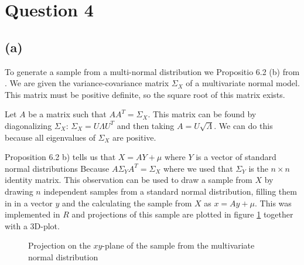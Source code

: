 \documentclass[a4paper]{article}
\begin{document}
\newpage
\section*{Question 4}
\noindent {}

\subsection*{(a)}
\noindent {}

To generate a sample from a multi-normal distribution we Propositio 6.2 (b) from \cite{course-notes}. We are given the variance-covariance matrix $\Sigma_X$ of a multivariate normal model. This matrix must be positive definite, so the square root of this matrix exists. 

Let $A$ be a matrix such that $AA^T=\Sigma_X$. This matrix can be found by diagonalizing $\Sigma_X$: $\Sigma_X=U\Lambda U^T$ and then taking $A = U \sqrt{\Lambda}$. We can do this because all eigenvalues of $\Sigma_X$ are positive.

Proposition 6.2 b) tells us that $X = AY + \mu$ where $Y$ is a vector of standard normal distributions Because $A\Sigma_YA^T=\Sigma_X$ where we used that $\Sigma_Y$ is the $n\times n$ identity matrix.
This observation can be used to draw a sample from $X$ by drawing $n$ independent samples from a standard normal distribution, filling them in in a vector $y$ and the calculating the sample from $X$ as $x=Ay+\mu$. This was implemented in $R$ and projections of this sample are plotted in figure \ref{fig:sample} together with a 3D-plot.

\begin{figure}[H]
	\centering
	
	\caption{Projection on the $xy$-plane of the sample from the multivariate normal distribution}
	\label{fig:sample}
\end{figure}
\end{document}
